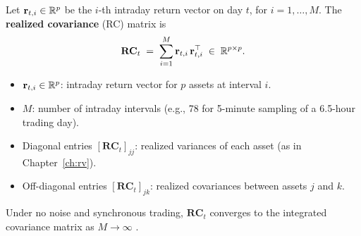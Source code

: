 \begin{definition}
Let $\mathbf{r}_{t,i} \in \mathbb{R}^p$ be the $i$-th intraday return vector on day $t$,
for $i = 1, \ldots, M$. The \textbf{realized covariance} (RC) matrix is
\begin{equation}\label{eq:rc}
  \mathbf{RC}_t \;=\; \sum_{i=1}^{M} \mathbf{r}_{t,i}\,\mathbf{r}_{t,i}^\top
  \;\in\; \mathbb{R}^{p \times p}.
\end{equation}
\begin{itemize}[nosep]
  \item $\mathbf{r}_{t,i} \in \mathbb{R}^p$: intraday return vector for $p$ assets at
        interval $i$.
  \item $M$: number of intraday intervals (e.g., 78 for 5-minute sampling of
        a 6.5-hour trading day).
  \item Diagonal entries $[\mathbf{RC}_t]_{jj}$: realized variances of each asset
        (as in Chapter~\ref{ch:rv}).
  \item Off-diagonal entries $[\mathbf{RC}_t]_{jk}$: realized covariances between
        assets $j$ and $k$.
\end{itemize}
Under no noise and synchronous trading, $\mathbf{RC}_t$ converges to the
integrated covariance matrix as $M \to \infty$
\citep{BarndorffNielsenHansenLundeShephard2011}.
\end{definition}

